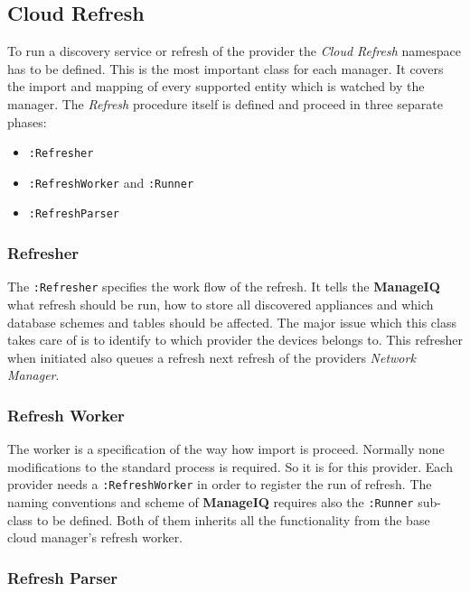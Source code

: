 \subsection{Cloud Refresh}
\label{sub:Cloud Refresh}

To run a discovery service or refresh of the provider the \emph{Cloud Refresh} namespace has to be defined. This is the most important class for each manager. It covers the import and mapping of every supported entity which is watched by the manager. The \emph{Refresh} procedure itself is defined and proceed in three separate phases:

\begin{itemize}
	\item \texttt{:Refresher}
	\item \texttt{:RefreshWorker} and \texttt{:Runner}
	\item \texttt{:RefreshParser}
\end{itemize}

\subsubsection{Refresher}
\label{subs:Refresher}

The \texttt{:Refresher} specifies the work flow of the refresh. It tells the \textbf{ManageIQ} what refresh should be run, how to store all discovered appliances and which database schemes and tables should be affected. The major issue which this class takes care of is to identify to which provider the devices belongs to. This refresher when initiated also queues a refresh next refresh of the providers \emph{Network Manager}.

\subsubsection{Refresh Worker}
\label{subs:Refresh Worker}

The worker is a specification of the way how import is proceed. Normally none modifications to the standard process is required. So it is for this provider. Each provider needs a \texttt{:RefreshWorker} in order to register the run of refresh. The naming conventions and scheme of \textbf{ManageIQ} requires also the \texttt{:Runner} sub-class to be defined. Both of them inherits all the functionality from the base cloud manager's refresh worker.

\subsubsection{Refresh Parser}
\label{subs:Refresh Parser}


